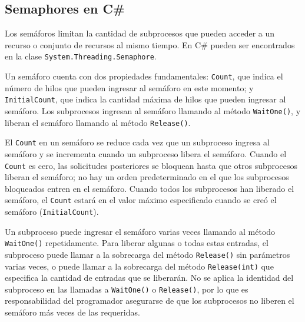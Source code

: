 \documentclass[10pt]{article} %
\newcommand{\csl}[1]{\colorbox{backcolour}{\texttt{#1}}}
\begin{document}
\subsection{Semaphores en C\#}

Los sem\'aforos limitan la cantidad de subprocesos que pueden acceder a un recurso o conjunto de recursos al mismo tiempo. En C\# pueden ser encontrados en la clase \csl{System.Threading.Semaphore}.

Un sem\'aforo cuenta con dos propiedades fundamentales: \csl{Count}, que indica el n\'umero de hilos que pueden ingresar al sem\'aforo en este momento; y \csl{InitialCount}, que indica la cantidad m\'axima de hilos que pueden ingresar al sem\'aforo. Los subprocesos ingresan al semáforo llamando al método \csl{WaitOne()}, y liberan el semáforo llamando al método \csl{Release()}.

El \csl{Count} en un semáforo se reduce cada vez que un subproceso ingresa al semáforo y se incrementa cuando un subproceso libera el semáforo. Cuando el \csl{Count} es cero, las solicitudes posteriores se bloquean hasta que otros subprocesos liberan el semáforo; no hay un orden predeterminado en el que los subprocesos bloqueados entren en el semáforo. Cuando todos los subprocesos han liberado el semáforo, el \csl{Count} estar\'a en el valor máximo especificado cuando se creó el semáforo (\csl{InitialCount}).

Un subproceso puede ingresar el semáforo varias veces llamando al método \csl{WaitOne()} repetidamente. Para liberar algunas o todas estas entradas, el subproceso puede llamar a la sobrecarga del método \csl{Release()} sin parámetros varias veces, o puede llamar a la sobrecarga del método \csl{Release(int)} que especifica la cantidad de entradas que se liberarán. No se aplica la identidad del subproceso en las llamadas a \csl{WaitOne()} o \csl{Release()}, por lo que es responsabilidad del programador asegurarse de que los subprocesos no liberen el semáforo m\'as veces de las requeridas. 

\end{document}
